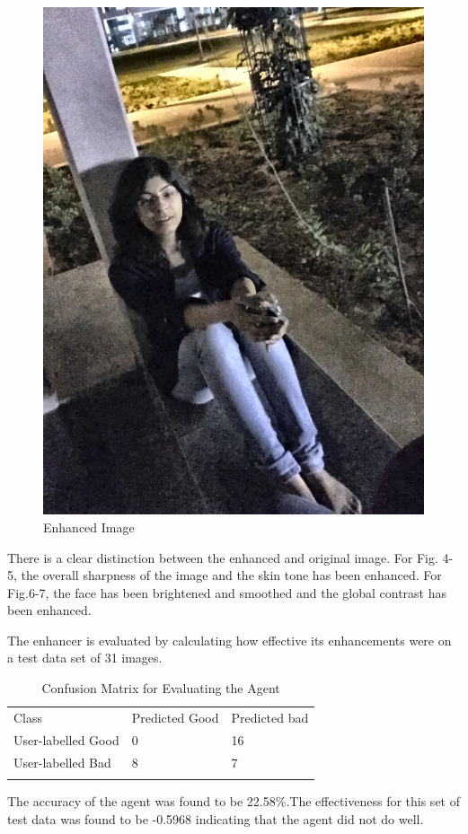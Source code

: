 \begin{figure}[!h]
  \includegraphics[scale=0.20]{Mugdha_sitting_enhanced.jpg}
\caption{Enhanced Image}
\label{fig:3}       
\end{figure}
There is a clear distinction between the enhanced and original image. For Fig. 4-5, the overall sharpness of the image and the skin tone has been enhanced. For Fig.6-7, the face has been brightened and smoothed and the global contrast has been enhanced.


 
The enhancer is evaluated by calculating how effective its enhancements were on a test data set of 31 images.
\begin{table}[H]
\caption{Confusion Matrix for Evaluating the Agent}
\label{tab:1}       %
\begin{tabular}{lll}
\hline\noalign{\smallskip}
Class & Predicted Good & Predicted bad  \\
\noalign{\smallskip}\hline\noalign{\smallskip}
User-labelled Good& 0 & 16 \\
User-labelled Bad & 8 & 7 \\
\noalign{\smallskip}\hline
\end{tabular}
\end{table}
The accuracy of the agent was found to be 22.58\%.The effectiveness for this set of test data was found to be -0.5968 indicating that the agent did not do well.


